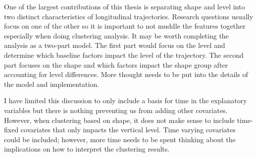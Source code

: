 One of the largest contributions of this thesis is separating shape and level into two distinct characteristics of longitudinal trajectories. Research questions usually focus on one of the other so it is important to not muddle the features together especially when doing clustering analysis. It may be worth completing the analysis as a two-part model. The first part would focus on the level and determine which baseline factors impact the level of the trajectory. The second part focuses on the shape and which factors impact the shape group after accounting for level differences. More thought needs to be put into the details of the model and implementation.

I have limited this discussion to only include a basis for time in the explanatory variables but there is nothing preventing us from adding other covariates. However, when clustering based on shape, it does not make sense to include time-fixed covariates that only impacts the vertical level. Time varying covariates could be included; however, more time needs to be spent thinking about the implications on how to interpret the clustering results. 

